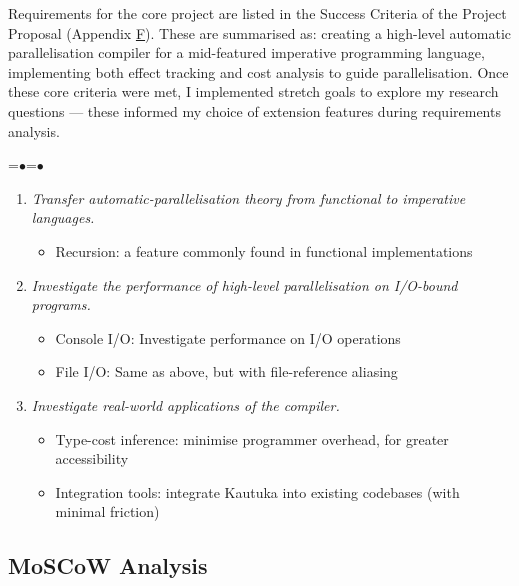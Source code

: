 \label{sec:2.7}

Requirements for the core project are listed in the Success Criteria of the Project Proposal (Appendix \hyperref[sec:F]{F}). These are summarised as: creating a high-level automatic parallelisation compiler for a mid-featured imperative programming language, implementing both effect tracking and cost analysis to guide parallelisation. Once these core criteria were met, I implemented stretch goals to explore my research questions --- these informed my choice of extension features during requirements analysis.

\newpage

\newlength{\mylen}
=\hbox{$\bullet$}=\hbox{\tiny$\bullet$}
\setlength{\mylen}{\dimexpr0.5\ht1-0.5\ht2}

\begin{enumerate}
  \renewcommand\labelitemi{\raisebox{\mylen}{\tiny$\bullet$}}

  \setlength{\itemsep}{2pt}
        \setlength{\parskip}{0pt}
        \setlength{\parsep}{0pt}
  \item \textit{Transfer automatic-parallelisation theory from functional to imperative languages.}
        \begin{itemize}
          \item Recursion: a feature commonly found in functional implementations
        \end{itemize}
  \item \textit{Investigate the performance of high-level parallelisation on I/O-bound programs.}
        \begin{itemize}
          \item Console I/O: Investigate performance on I/O operations
          \item File I/O: Same as above, but with file-reference aliasing
        \end{itemize}
  \item \textit{Investigate real-world applications of the compiler.}
        \begin{itemize}
          \item Type-cost inference: minimise programmer overhead, for greater accessibility
          \item Integration tools: integrate Kautuka into existing codebases (with minimal friction)
        \end{itemize}
\end{enumerate}


\subsection{MoSCoW Analysis}

